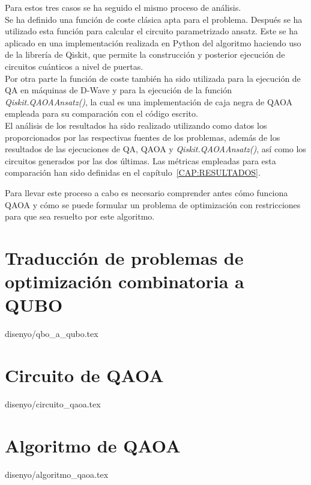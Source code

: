 Para estos tres casos se ha seguido el mismo proceso de análisis.
\\
Se ha definido una función de coste clásica apta para el problema.
Después se ha utilizado esta función para calcular el circuito parametrizado ansatz.
Este se ha aplicado en una implementación realizada en Python del algoritmo haciendo uso de la librería de Qiskit, que permite la construcción y posterior ejecución de circuitos cuánticos a nivel de puertas.
\\
Por otra parte la función de coste también ha sido utilizada para la ejecución de QA en máquinas de D-Wave y para la ejecución de la función \textit{Qiskit.QAOAAnsatz()}, la cual es una implementación de caja negra de QAOA empleada para su comparación con el código escrito.
\\
El análisis de los resultados ha sido realizado utilizando como datos los proporcionados por las respectivas fuentes de los problemas, además de los resultados de las ejecuciones de QA, QAOA y \textit{Qiskit.QAOAAnsatz()}, así como los circuitos generados por las dos últimas.
Las métricas empleadas para esta comparación han sido definidas en el capítulo~\ref{CAP:RESULTADOS}.

Para llevar este proceso a cabo es necesario comprender antes cómo funciona QAOA y cómo se puede formular un problema de optimización con restricciones para que sea resuelto por este algoritmo.

\section{Traducción de problemas de optimización combinatoria a QUBO\label{sec:3-problemas de optimizacion combinatoria}}{disenyo/qbo_a_qubo.tex}

\section{Circuito de QAOA\label{sec:3-circuito de qaoa}}{disenyo/circuito_qaoa.tex}

\section{Algoritmo de QAOA}{disenyo/algoritmo_qaoa.tex}


